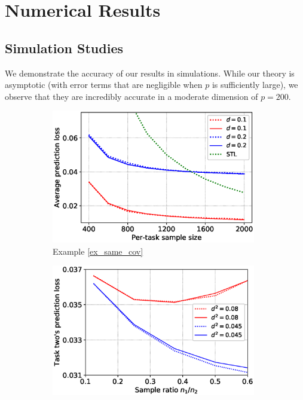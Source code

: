 \section{Numerical Results}

\subsection{Simulation Studies}\label{sec_simulation}

We demonstrate the accuracy of our results in simulations.
While our theory is asymptotic (with error terms that are negligible when $p$ is sufficiently large), we observe that they are incredibly accurate in a moderate dimension of $p = 200$.


\begin{figure}[!t]
	\begin{subfigure}[b]{0.33\textwidth}
		\centering
		\includegraphics[width=0.98\textwidth]{figures/same_covariates.eps}
		\caption{Example \ref{ex_same_cov}}
		\label{fig_same_cov}
	\end{subfigure}\hfill
	\begin{subfigure}[b]{0.33\textwidth}
		\centering
		\includegraphics[width=0.98\textwidth]{figures/sample_ratio_several_d.eps}

\end{subfigure}
\end{figure}
